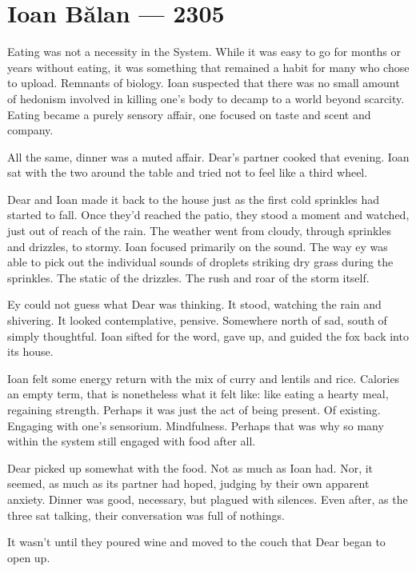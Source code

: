 \hypertarget{ioan-bux103lan-2305}{%
\chapter*{Ioan Bălan — 2305}\label{ioan-bux103lan-2305}}

Eating was not a necessity in the System. While it was easy to go for months or years without eating, it was something that remained a habit for many who chose to upload. Remnants of biology. Ioan suspected that there was no small amount of hedonism involved in killing one's body to decamp to a world beyond scarcity. Eating became a purely sensory affair, one focused on taste and scent and company.

All the same, dinner was a muted affair. Dear's partner cooked that evening. Ioan sat with the two around the table and tried not to feel like a third wheel.

Dear and Ioan made it back to the house just as the first cold sprinkles had started to fall. Once they'd reached the patio, they stood a moment and watched, just out of reach of the rain. The weather went from cloudy, through sprinkles and drizzles, to stormy. Ioan focused primarily on the sound. The way ey was able to pick out the individual sounds of droplets striking dry grass during the sprinkles. The static of the drizzles. The rush and roar of the storm itself.

Ey could not guess what Dear was thinking. It stood, watching the rain and shivering. It looked contemplative, pensive. Somewhere north of sad, south of simply thoughtful. Ioan sifted for the word, gave up, and guided the fox back into its house.

Ioan felt some energy return with the mix of curry and lentils and rice. Calories an empty term, that is nonetheless what it felt like: like eating a hearty meal, regaining strength. Perhaps it was just the act of being present. Of existing. Engaging with one's sensorium. Mindfulness. Perhaps that was why so many within the system still engaged with food after all.

Dear picked up somewhat with the food. Not as much as Ioan had. Nor, it seemed, as much as its partner had hoped, judging by their own apparent anxiety. Dinner was good, necessary, but plagued with silences. Even after, as the three sat talking, their conversation was full of nothings.

It wasn't until they poured wine and moved to the couch that Dear began to open up.

